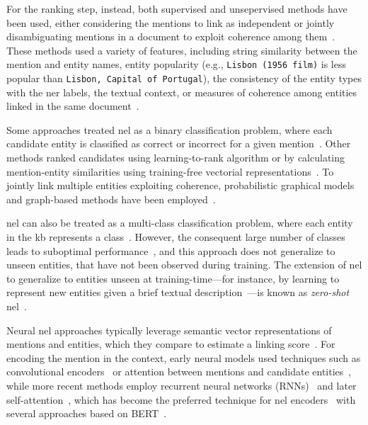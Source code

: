 For the ranking step, instead, both supervised and unsepervised methods have been used, either considering the mentions to link as independent or jointly disambiguating mentions in a document to exploit coherence among them~\cite{entity_linking_with_kb_2015}. These methods used a variety of features, including string similarity between the mention and entity names, entity popularity (e.g., \texttt{Lisbon (1956 film)} is less popular than \texttt{Lisbon, Capital of Portugal}), the consistency of the entity types with the \ac{ner} labels, the textual context, or measures of coherence among entities linked in the same document~\cite{entity_linking_with_kb_2015}.

Some approaches treated \ac{nel} as a binary classification problem, where each candidate entity is classified as correct or incorrect for a given mention~\cite{entity_linking_with_kb_2015}. Other methods ranked candidates using learning-to-rank algorithm or by calculating mention-entity similarities using training-free vectorial representations~\cite{entity_linking_with_kb_2015}. To jointly link multiple entities exploiting coherence, probabilistic graphical models and graph-based methods have been employed~\cite{entity_linking_with_kb_2015}.

\ac{nel} can also be treated as a multi-class classification problem, where each entity in the \ac{kb} represents a class~\cite{kar2018task}. However, the consequent large number of classes leads to suboptimal performance~\cite{Sevgili2022NeuralEL}, and this approach does not generalize to unseen entities, that have not been observed during training. The extension of \ac{nel} to generalize to entities unseen at training-time---for instance, by learning to represent new entities given a brief textual description~\cite{logeswaran-etal-2019-zero,blink}---is known as \emph{zero-shot} \ac{nel}~\cite{logeswaran-etal-2019-zero}.

Neural \ac{nel} approaches typically leverage semantic vector representations of mentions and entities, which they compare to estimate a linking score~\cite{Sevgili2022NeuralEL}. For encoding the mention in the context, early neural models used techniques such as convolutional encoders~\cite{francis-landau-etal-2016-capturing,nguyen-etal-2016-joint,sorokin-gurevych-2018-mixing,sun-etal-2015-modeling} or attention between mentions and candidate entities~\cite{ganea-hofmann-2017-deep,le-titov-2019-boosting}, while more recent methods employ recurrent neural networks (RNNs)~\cite{kolitsas-etal-2018-end2end,gupta-etal-2017-entity,martins-etal-2019-joint} and later self-attention~\cite{logeswaran-etal-2019-zero,blink,yamada-etal-2022-global}, which has become the preferred technique for \ac{nel} encoders~\cite{Sevgili2022NeuralEL} with several approaches based on BERT~\cite{logeswaran-etal-2019-zero,blink,yamada-etal-2022-global}.


